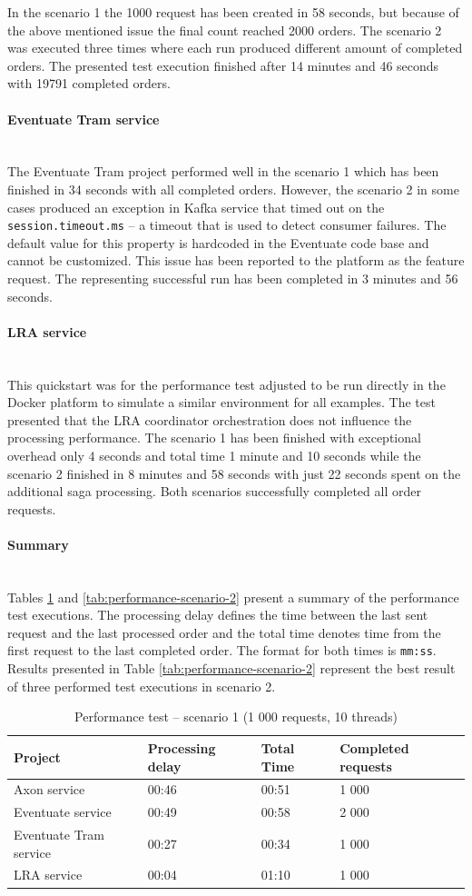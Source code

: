 \documentclass[oneside,
  digital, %
  table,   %
  lof,     %
  lot,     %
]{fithesis3}
\newcommand{\newlinepar}[1]{\paragraph{#1}\needspace{3\baselineskip}\mbox{}\\}
\begin{document}
In the scenario 1 the 1000 request has been created in 58 seconds, but because of the above mentioned issue the final count reached 2000 orders. The scenario 2 was executed three times where each run produced different amount of completed orders. The presented test execution finished after 14 minutes and 46 seconds with 19791 completed orders.

\newlinepar{Eventuate Tram service}

The Eventuate Tram project performed well in the scenario 1 which has been finished in 34 seconds with all completed orders. However, the scenario 2 in some cases produced an exception in Kafka service that timed out on the \texttt{session.timeout.ms} -- a timeout that is used to detect consumer failures. The default value for this property is hardcoded in the Eventuate code base and cannot be customized. This issue has been reported to the platform as the feature request. The representing successful run has been completed in 3 minutes and 56 seconds.

\newlinepar{LRA service}

This quickstart was for the performance test adjusted to be run directly in the Docker platform to simulate a similar environment for all examples. The test presented that the LRA coordinator orchestration does not influence the processing performance. The scenario 1 has been finished with exceptional overhead only 4 seconds and total time 1 minute and 10 seconds while the scenario 2 finished in 8 minutes and 58 seconds with just 22 seconds spent on the additional saga processing. Both scenarios successfully completed all order requests.

\newlinepar{Summary}

Tables \ref{tab:performance-scenario-1} and \ref{tab:performance-scenario-2} present a summary of the performance test executions. The processing delay defines the time between the last sent request and the last processed order and the total time denotes time from the first request to the last completed order. The format for both times is \texttt{mm:ss}. Results presented in Table \ref{tab:performance-scenario-2} represent the best result of three performed test executions in scenario 2.

\begin{table}[h]
    \begin{tabularx}{\textwidth}{lXXX}
        \toprule
        Project & Processing delay & Total Time & Completed requests \\
        \midrule
        Axon service & 00:46 & 00:51 & 1 000 \\
        Eventuate service & 00:49 & 00:58 & 2 000 \\
        Eventuate Tram service & 00:27 & 00:34 & 1 000 \\
        LRA service & 00:04 & 01:10 & 1 000 \\
        \bottomrule
    \end{tabularx}
    \caption{Performance test -- scenario 1 (1 000 requests, 10 threads)}
    \label{tab:performance-scenario-1}
\end{table}
\end{document}
